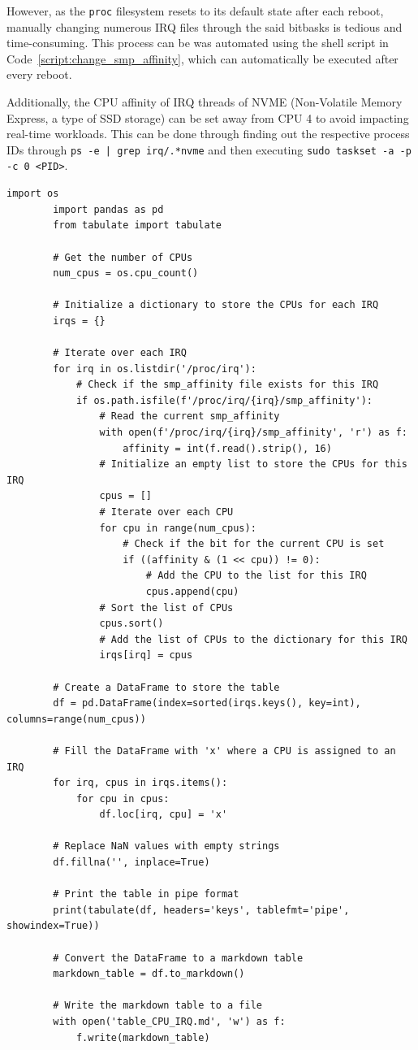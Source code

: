 \documentclass[MMR,Master,english]{twbook}
\begin{document}
\bigskip \noindent However, as the \texttt{proc} filesystem resets to its default state after each reboot, manually changing numerous IRQ files through the said bitbasks is tedious and time-consuming. This process can be was automated using the shell script in Code~\ref{script:change_smp_affinity}, which can automatically be executed after every reboot.

\bigskip \noindent Additionally, the CPU affinity of IRQ threads of NVME (Non-Volatile Memory Express, a type of SSD storage) can be set away from CPU 4 to avoid impacting real-time workloads. This can be done through finding out the respective process IDs through \texttt{ps -e | grep irq/.*nvme} and then executing \texttt{sudo taskset -a -p -c 0 <PID>}.

\clearpage

\vspace*{-5em}
\begin{lstlisting}[name={Code to show a table of the distribution of interrupt requests across each CPU},label={script:smp_affinity}]
		import os
		import pandas as pd
		from tabulate import tabulate
		
		# Get the number of CPUs
		num_cpus = os.cpu_count()
		
		# Initialize a dictionary to store the CPUs for each IRQ
		irqs = {}
		
		# Iterate over each IRQ
		for irq in os.listdir('/proc/irq'):
			# Check if the smp_affinity file exists for this IRQ
			if os.path.isfile(f'/proc/irq/{irq}/smp_affinity'):
				# Read the current smp_affinity
				with open(f'/proc/irq/{irq}/smp_affinity', 'r') as f:
					affinity = int(f.read().strip(), 16)
				# Initialize an empty list to store the CPUs for this IRQ
				cpus = []
				# Iterate over each CPU
				for cpu in range(num_cpus):
					# Check if the bit for the current CPU is set
					if ((affinity & (1 << cpu)) != 0):
						# Add the CPU to the list for this IRQ
						cpus.append(cpu)
				# Sort the list of CPUs
				cpus.sort()
				# Add the list of CPUs to the dictionary for this IRQ
				irqs[irq] = cpus
		
		# Create a DataFrame to store the table
		df = pd.DataFrame(index=sorted(irqs.keys(), key=int), columns=range(num_cpus))
		
		# Fill the DataFrame with 'x' where a CPU is assigned to an IRQ
		for irq, cpus in irqs.items():
			for cpu in cpus:
				df.loc[irq, cpu] = 'x'
		
		# Replace NaN values with empty strings
		df.fillna('', inplace=True)
		
		# Print the table in pipe format
		print(tabulate(df, headers='keys', tablefmt='pipe', showindex=True))
		
		# Convert the DataFrame to a markdown table
		markdown_table = df.to_markdown()
		
		# Write the markdown table to a file
		with open('table_CPU_IRQ.md', 'w') as f:
			f.write(markdown_table)
\end{lstlisting}
\end{document}

